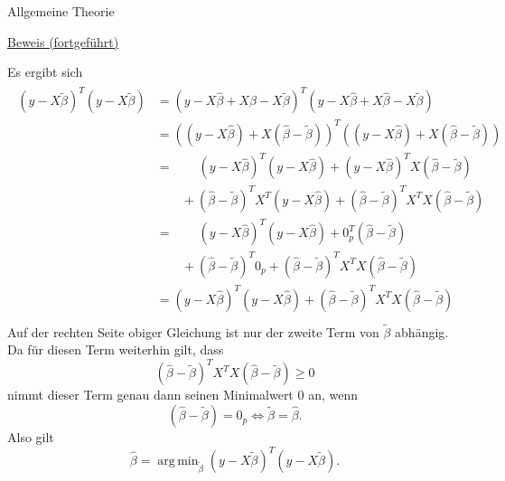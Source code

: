 \documentclass[
  8pt,
  ignorenonframetext,
]{beamer}
\DeclareMathOperator*{\argmin}{arg\,min}
\begin{document}
\begin{frame}{Allgemeine Theorie}
\protect\hypertarget{allgemeine-theorie-2}{}
\footnotesize

\underline{Beweis (fortgeführt)}

Es ergibt sich \begin{align}
\begin{split}
(y - X\tilde{\beta})^T(y - X\tilde{\beta})
& = (y - X\hat{\beta} + X\hat{\beta} - X\tilde{\beta})^T(y - X\hat{\beta} + X\hat{\beta} - X\tilde{\beta}) \\
& = ((y - X\hat{\beta}) + X(\hat{\beta} -\tilde{\beta}))^T((y - X\hat{\beta}) + X(\hat{\beta} -\tilde{\beta})) \\
& = \quad\quad
     (y - X\hat{\beta})^T(y - X\hat{\beta})
   + (y - X\hat{\beta})^T X(\hat{\beta} -\tilde{\beta}) \\
&  \quad\quad
   + (\hat{\beta} -\tilde{\beta})^TX^T(y - X\hat{\beta})
   + (\hat{\beta} -\tilde{\beta})^TX^TX(\hat{\beta} -\tilde{\beta}) \\
& = \quad\quad
     (y - X\hat{\beta})^T(y - X\hat{\beta})
   +  0_p^T(\hat{\beta} -\tilde{\beta}) \\
&  \quad\quad
   + (\hat{\beta} -\tilde{\beta})^T0_p
   + (\hat{\beta} -\tilde{\beta})^TX^TX(\hat{\beta} -\tilde{\beta}) \\
& = (y - X\hat{\beta})^T(y - X\hat{\beta}) + (\hat{\beta} -\tilde{\beta})^TX^TX(\hat{\beta} -\tilde{\beta}) \\
\end{split}
\end{align} Auf der rechten Seite obiger Gleichung ist nur der zweite
Term von \(\tilde{\beta}\) abhängig. Da für diesen Term weiterhin gilt,
dass \begin{equation}
(\hat{\beta} -\tilde{\beta})^TX^TX(\hat{\beta} -\tilde{\beta}) \ge 0
\end{equation} nimmt dieser Term genau dann seinen Minimalwert 0 an,
wenn \begin{equation}
(\hat{\beta} -\tilde{\beta}) = 0_p \Leftrightarrow \tilde{\beta} = \hat{\beta}.
\end{equation} Also gilt \begin{equation}
\hat{\beta} = \argmin_{\tilde{\beta}} (y - X\tilde{\beta})^T(y - X\tilde{\beta}).
\end{equation}
\end{frame}
\end{document}
